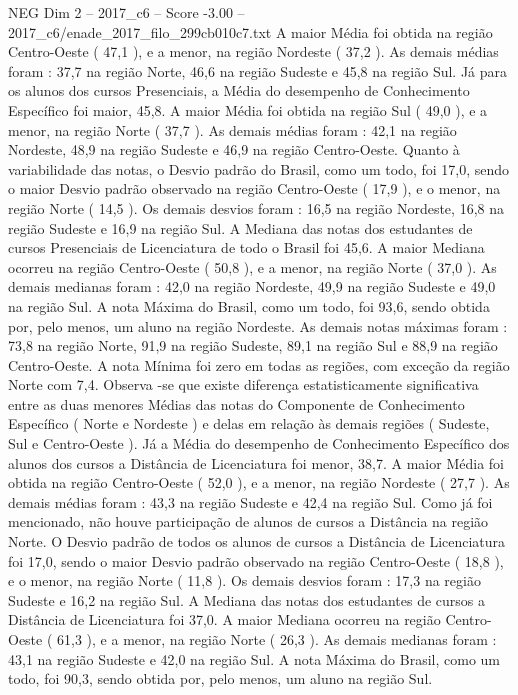 \begin{textsample}{NEG Dim 2 – 2017\_c6 – Score -3.00 – 2017\_c6/enade\_2017\_filo\_299cb010c7.txt}
A maior Média foi obtida na região Centro-Oeste ( 47,1 ), e a menor, na região Nordeste ( 37,2 ).
As demais médias foram : 37,7 na região Norte, 46,6 na região Sudeste e 45,8 na região Sul.
Já para os alunos dos cursos Presenciais, a Média do desempenho de Conhecimento Específico foi maior, 45,8.
A maior Média foi obtida na região Sul ( 49,0 ), e a menor, na região Norte ( 37,7 ).
As demais médias foram : 42,1 na região Nordeste, 48,9 na região Sudeste e 46,9 na região Centro-Oeste.
Quanto à variabilidade das notas, o Desvio padrão do Brasil, como um todo, foi 17,0, sendo o maior Desvio padrão observado na região Centro-Oeste ( 17,9 ), e o menor, na região Norte ( 14,5 ).
Os demais desvios foram : 16,5 na região Nordeste, 16,8 na região Sudeste e 16,9 na região Sul.
A Mediana das notas dos estudantes de cursos Presenciais de Licenciatura de todo o Brasil foi 45,6.
A maior Mediana ocorreu na região Centro-Oeste ( 50,8 ), e a menor, na região Norte ( 37,0 ).
As demais medianas foram : 42,0 na região Nordeste, 49,9 na região Sudeste e 49,0 na região Sul.
A nota Máxima do Brasil, como um todo, foi 93,6, sendo obtida por, pelo menos, um aluno na região Nordeste.
As demais notas máximas foram : 73,8 na região Norte, 91,9 na região Sudeste, 89,1 na região Sul e 88,9 na região Centro-Oeste.
A nota Mínima foi zero em todas as regiões, com exceção da região Norte com 7,4.
Observa -se que existe diferença estatisticamente significativa entre as duas menores Médias das notas do Componente de Conhecimento Específico ( Norte e Nordeste ) e delas em relação às demais regiões ( Sudeste, Sul e Centro-Oeste ).
Já a Média do desempenho de Conhecimento Específico dos alunos dos cursos a Distância de Licenciatura foi menor, 38,7.
A maior Média foi obtida na região Centro-Oeste ( 52,0 ), e a menor, na região Nordeste ( 27,7 ).
As demais médias foram : 43,3 na região Sudeste e 42,4 na região Sul.
Como já foi mencionado, não houve participação de alunos de cursos a Distância na região Norte.
O Desvio padrão de todos os alunos de cursos a Distância de Licenciatura foi 17,0, sendo o maior Desvio padrão observado na região Centro-Oeste ( 18,8 ), e o menor, na região Norte ( 11,8 ).
Os demais desvios foram : 17,3 na região Sudeste e 16,2 na região Sul.
A Mediana das notas dos estudantes de cursos a Distância de Licenciatura foi 37,0.
A maior Mediana ocorreu na região Centro-Oeste ( 61,3 ), e a menor, na região Norte ( 26,3 ).
As demais medianas foram : 43,1 na região Sudeste e 42,0 na região Sul.
A nota Máxima do Brasil, como um todo, foi 90,3, sendo obtida por, pelo menos, um aluno na região Sul.

\end{textsample}
